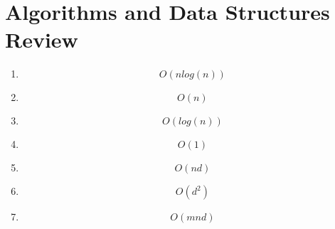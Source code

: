 \documentclass{article}
\begin{document}
\section{Algorithms and Data Structures Review}
\begin{enumerate}
    \item 
    \[
        O(n log(n))
    \]
    \item 
    \[
        O(n)
    \]
    \item 
    \[
        O(log(n))
    \]
    \item 
    \[
        O(1)
    \]
    \item 
    \[
        O(nd)
    \]
    \item 
    \[
        O(d^2)
    \]
    \item 
    \[
        O(mnd)
    \]
\end{enumerate}
\end{document}
